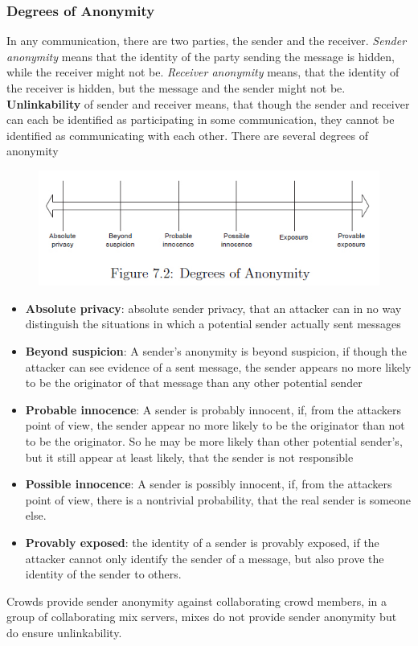 \documentclass[a4paper, 10 pt, conference]{ieeeconf}
\begin{document}
\subsubsection{\textbf{Degrees of Anonymity}}
\label{degreeofano}
In any communication, there are two parties, the sender and the receiver. \emph{Sender anonymity} means that the identity of the party sending the message is hidden, while the receiver might not be. \emph{Receiver anonymity} means, that the identity of the receiver is hidden, but the message and the sender might not be. \\
\textbf{Unlinkability} of sender and receiver means, that though the sender and receiver can each be identified as participating in some communication, they cannot be identified as communicating with each other. 
There are several degrees of anonymity
\begin{figure}[h!]
\centering
\includegraphics[width=\columnwidth]{images/diagrams/anonymity.jpg} 
\end{figure}
\begin{itemize}
\item \textbf{Absolute privacy}: absolute sender privacy, that an attacker can in no way distinguish the situations in which a potential sender actually sent messages
\item \textbf{Beyond suspicion}: A sender's anonymity is beyond suspicion, if though the attacker can see evidence of a sent message, the sender appears no more likely to be the originator of that message than any other potential sender
\item \textbf{Probable innocence}: A sender is probably innocent, if, from the attackers point of view, the sender appear no more likely to be the originator than not to be the originator. So he may be more likely than other potential sender's, but it still appear at least likely, that the sender is not responsible
\item \textbf{Possible innocence}: A sender is possibly innocent, if, from the attackers point of view, there is a nontrivial probability, that the real sender is someone else.
\item \textbf{Provably exposed}: the identity of a sender is provably exposed, if the attacker cannot only identify the sender of a message, but also prove the identity of the sender to others.
\end{itemize}
Crowds provide sender anonymity against collaborating crowd members, in a group of collaborating mix servers, mixes do not provide sender anonymity but do ensure unlinkability. 
\end{document}
